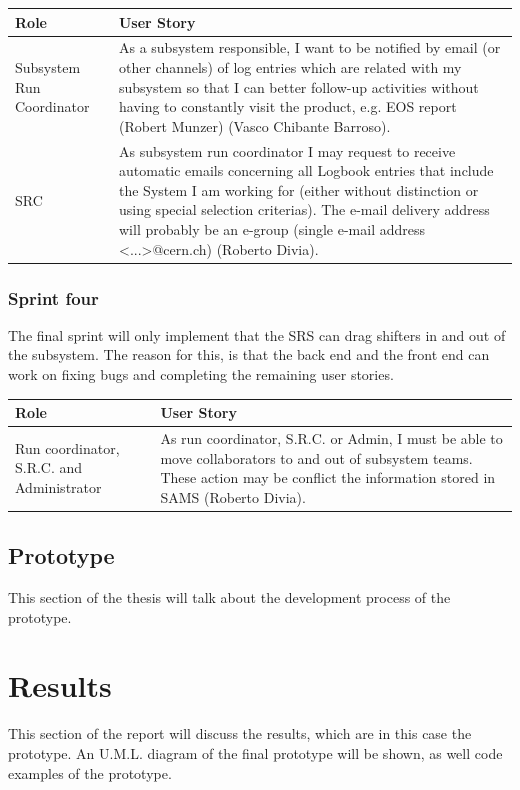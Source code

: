 \documentclass[paper=a4, fontsize=11pt,twoside]{scrartcl}	%
\begin{document}
\begin{longtable}{ | p{4cm} | p{10cm} |}
\hline
Role & User Story \\ \hline
Subsystem Run Coordinator &  As a subsystem responsible, I want to be notified by email (or other
channels) of log entries which are related with my subsystem so that I can better follow-up activities without having to constantly visit the product, e.g. EOS report (Robert Munzer) (Vasco Chibante Barroso).  \\ \hline
SRC & As subsystem run coordinator I may request to receive automatic emails concerning all Logbook entries that include the System I am working for (either without distinction or using special selection criterias). The e-mail delivery address will probably be an e-group (single e-mail address <...>@cern.ch) (Roberto Divia). \\ \hline
\end{longtable}

\subsubsection{Sprint four}
The final sprint will only implement that the SRS can drag shifters in and out of the subsystem. The reason for this, is that the back end and the front end can work on fixing bugs and completing the remaining user stories.

\begin{longtable}{ | p{4cm} | p{10cm} |}
\hline
Role & User Story \\ \hline
Run coordinator, S.R.C. and Administrator &  As run coordinator, S.R.C. or Admin, I must be able to move collaborators to and out of subsystem teams. These action may be conflict the information stored in SAMS (Roberto Divia). \\ \hline
\end{longtable}

\newpage
\subsection{Prototype}
This section of the thesis will talk about the development process of the prototype.

\newpage
\section{Results}
This section of the report will discuss the results, which are in this case the prototype. An U.M.L. diagram of the final prototype will be shown, as well code examples of the prototype.
\end{document}

